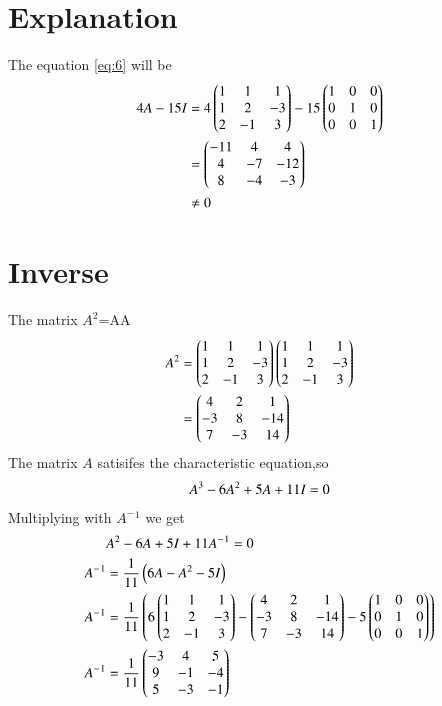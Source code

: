 \documentclass[journal,12pt,twocolumn]{IEEEtran}
\providecommand{\brak}[1]{\ensuremath{\left(#1\right)}}
\newcommand{\myvec}[1]{\ensuremath{\begin{pmatrix}#1\end{pmatrix}}}
\numberwithin{equation}{subsection}
\begin{document}
\section{Explanation}

The equation \eqref{eq:6} will be
\begin{align}
    4A-15I&=4\myvec{1&1&1 \\ 1&2&-3 \\ 2&-1&3}-15\myvec{1&0&0 \\ 0&1&0 \\ 0&0&1}\notag\\
    &=\myvec{-11&4&4\\4&-7&-12\\8&-4&-3}\notag\\
    &\neq0
\end{align}
\section{Inverse}
The matrix $A^2$=AA
\begin{align}
    A^2&=\myvec{1 & 1 & 1\\1 & 2 &-3\\2& -1 &3}\myvec{1 & 1 & 1\\1 & 2 &-3\\2& -1 &3}\notag\\
    &=\myvec{4&2&1\\-3&8&-14\\7&-3&14}\notag
\end{align}
The matrix $A$ satisifes the characteristic equation,so
\begin{align}
    A^3-6A^2+5A+11I=0\notag
\end{align}
Multiplying with $A^-{^1}$ we get
\begin{align}
    &A^2-6A+5I+11A^-{^1}=0\notag\\
    A^-{^1}&=\frac{1}{11}\brak{6A-A^2-5I}\notag\\
    A^-{^1}&=\frac{1}{11}\brak{6\myvec{1 & 1 & 1\\1 & 2 &-3\\2& -1 &3}-\myvec{4&2&1\\-3&8&-14\\7&-3&14}-5\myvec{1&0&0\\0&1&0\\0&0&1}}\notag\\
    A^-{^1}&=\frac{1}{11}\myvec{-3&4&5\\9&-1&-4\\5&-3&-1}
\end{align}
\end{document}
